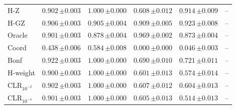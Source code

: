 \begin{tabular}{lccccc}
H-Z & $0.902\,{\scriptstyle\pm 0.003}$ & $1.000\,{\scriptstyle\pm 0.000}$ & $0.608\,{\scriptstyle\pm 0.012}$ & $0.914\,{\scriptstyle\pm 0.009}$ & -- \\
H-GZ & $0.906\,{\scriptstyle\pm 0.003}$ & $0.905\,{\scriptstyle\pm 0.004}$ & $0.909\,{\scriptstyle\pm 0.005}$ & $0.923\,{\scriptstyle\pm 0.008}$ & -- \\
Oracle & $0.901\,{\scriptstyle\pm 0.003}$ & $0.878\,{\scriptstyle\pm 0.004}$ & $0.969\,{\scriptstyle\pm 0.002}$ & $0.873\,{\scriptstyle\pm 0.004}$ & -- \\
Coord & $0.438\,{\scriptstyle\pm 0.006}$ & $0.584\,{\scriptstyle\pm 0.008}$ & $0.000\,{\scriptstyle\pm 0.000}$ & $0.046\,{\scriptstyle\pm 0.003}$ & -- \\
Bonf & $0.922\,{\scriptstyle\pm 0.003}$ & $1.000\,{\scriptstyle\pm 0.000}$ & $0.690\,{\scriptstyle\pm 0.010}$ & $0.721\,{\scriptstyle\pm 0.011}$ & -- \\
H-weight & $0.900\,{\scriptstyle\pm 0.003}$ & $1.000\,{\scriptstyle\pm 0.000}$ & $0.601\,{\scriptstyle\pm 0.013}$ & $0.574\,{\scriptstyle\pm 0.014}$ & -- \\
CLR$_{10^{-2}}$ & $0.902\,{\scriptstyle\pm 0.003}$ & $1.000\,{\scriptstyle\pm 0.000}$ & $0.607\,{\scriptstyle\pm 0.012}$ & $0.604\,{\scriptstyle\pm 0.013}$ & -- \\
CLR$_{10^{-4}}$ & $0.901\,{\scriptstyle\pm 0.003}$ & $1.000\,{\scriptstyle\pm 0.000}$ & $0.605\,{\scriptstyle\pm 0.013}$ & $0.514\,{\scriptstyle\pm 0.013}$ & -- \\
\bottomrule
\end{tabular}
